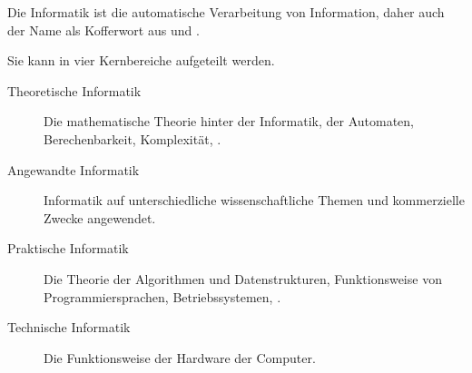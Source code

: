 \documentclass{article}
\begin{document}
Die Informatik ist die automatische Verarbeitung von Information, daher auch der Name als Kofferwort aus  und .

Sie kann in vier Kernbereiche aufgeteilt werden.
\begin{description}
 \item[Theoretische Informatik] Die mathematische Theorie hinter der Informatik, der Automaten, Berechenbarkeit, Komplexität, \etc.
 \item[Angewandte Informatik] Informatik auf unterschiedliche wissenschaftliche Themen und kommerzielle Zwecke angewendet.
 \item[Praktische Informatik] Die Theorie der Algorithmen und Datenstrukturen, Funktionsweise von Programmiersprachen, Betriebssystemen, \etc.
 \item[Technische Informatik] Die Funktionsweise der Hardware der Computer.
\end{description}
\end{document}
